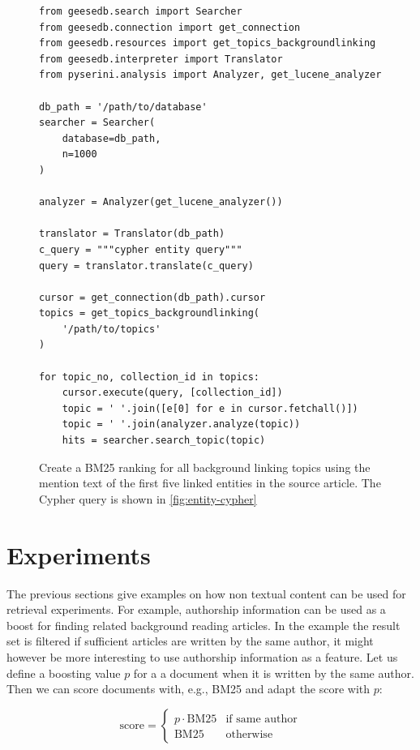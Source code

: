 \begin{figure}
	\begin{verbatim}
from geesedb.search import Searcher
from geesedb.connection import get_connection
from geesedb.resources import get_topics_backgroundlinking
from geesedb.interpreter import Translator
from pyserini.analysis import Analyzer, get_lucene_analyzer

db_path = '/path/to/database'
searcher = Searcher(
    database=db_path,
    n=1000
)

analyzer = Analyzer(get_lucene_analyzer())

translator = Translator(db_path)
c_query = """cypher entity query"""
query = translator.translate(c_query)

cursor = get_connection(db_path).cursor
topics = get_topics_backgroundlinking(
    '/path/to/topics'
)

for topic_no, collection_id in topics:
    cursor.execute(query, [collection_id])
    topic = ' '.join([e[0] for e in cursor.fetchall()]) 
    topic = ' '.join(analyzer.analyze(topic))
    hits = searcher.search_topic(topic)
	\end{verbatim}
	\caption{Create a BM25 ranking for all background linking topics using the mention text of the first five linked entities in the source article. The Cypher query is shown in \cref{fig:entity-cypher}}
	\label{fig:entities-code}
\end{figure}

\section{Experiments}
The previous sections give examples on how non textual content can be used for retrieval experiments. For example, authorship information can be used as a boost for finding related background reading articles. In the example the result set is filtered if sufficient articles are written by the same author, it might however be more interesting to use authorship information as a feature. Let us define a boosting value $p$ for a a document when it is written by the same author. Then we can score documents with, e.g., BM25 and adapt the score with $p$:

\begin{equation}
	\text{score} = \begin{cases}
		p \cdot \text{BM}25  & \text{if same author} \\
		\text{BM}25 & \text{otherwise}
	\end{cases}
\end{equation}

